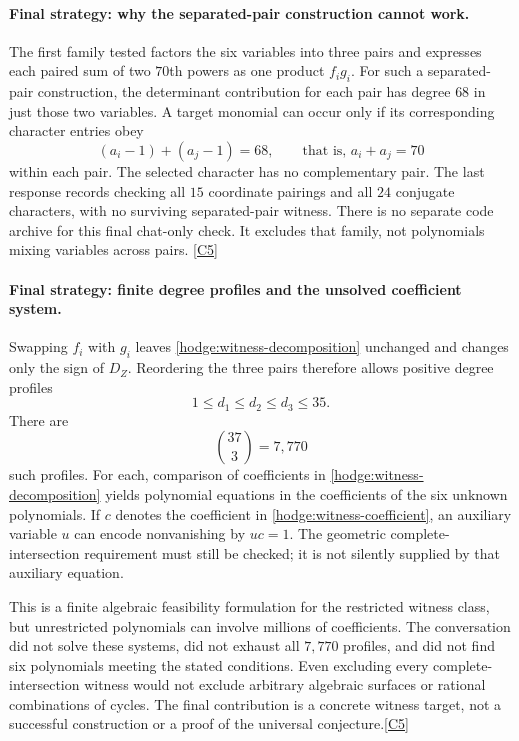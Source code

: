 \documentclass[11pt]{article}
\newcommand{\src}[1]{\hyperlink{src:#1}{[#1]}}
\begin{document}
\paragraph{Final strategy: why the separated-pair construction cannot work.}
The first family tested factors the six variables into three pairs and
expresses each paired sum of two $70$th powers as one product $f_ig_i$.
For such a separated-pair construction, the determinant contribution for
each pair has degree $68$ in just those two variables. A target monomial
can occur only if its corresponding character entries obey
\[
 (a_i-1)+(a_j-1)=68,\qquad\text{that is, }a_i+a_j=70
\]
within each pair. The selected character has no complementary pair.
The last response records checking all $15$ coordinate pairings and all
$24$ conjugate characters, with no surviving separated-pair witness.
There is no separate code archive for this final chat-only check.
It excludes that family, not polynomials mixing variables across pairs.
\src{C5}

\paragraph{Final strategy: finite degree profiles and the unsolved coefficient system.}
Swapping $f_i$ with $g_i$ leaves
\eqref{hodge:witness-decomposition} unchanged and changes only the sign of
$D_Z$. Reordering the three pairs therefore allows positive degree profiles
\[
 1\le d_1\le d_2\le d_3\le35.
\]
There are
\begin{equation}\label{hodge:degree-profiles}
 \binom{37}{3}=7,770
\end{equation}
such profiles. For each, comparison of coefficients in
\eqref{hodge:witness-decomposition} yields polynomial equations in the
coefficients of the six unknown polynomials. If $c$ denotes the coefficient
in \eqref{hodge:witness-coefficient}, an auxiliary variable $u$ can encode
nonvanishing by $uc=1$. The geometric complete-intersection requirement
must still be checked; it is not silently supplied by that auxiliary
equation.

This is a finite algebraic feasibility formulation for the restricted
witness class, but unrestricted polynomials can involve millions of
coefficients. The conversation did not solve these systems, did not exhaust
all $7,770$ profiles, and did not find six polynomials meeting the stated
conditions. Even excluding every complete-intersection witness would not
exclude arbitrary algebraic surfaces or rational combinations of cycles.
The final contribution is a concrete witness target, not a successful
construction or a proof of the universal conjecture.\src{C5}
\end{document}
